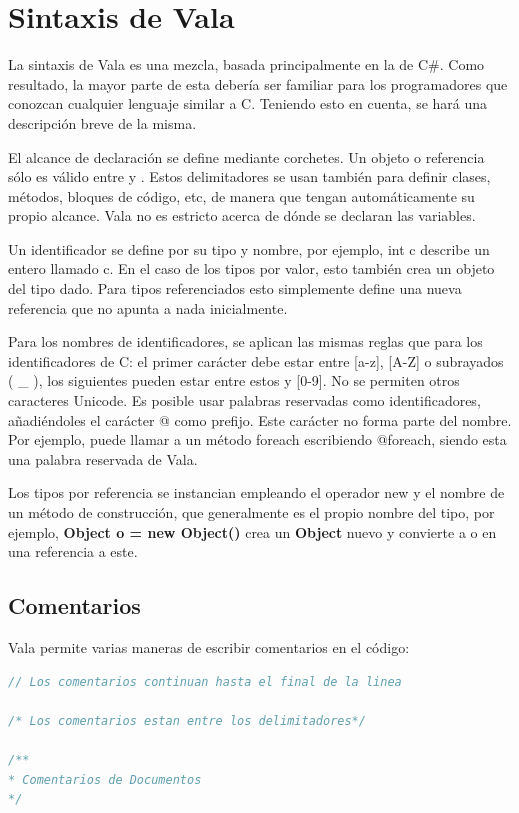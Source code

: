 \documentclass[12pt,twoside]{book}
\begin{document}
\chapter{Sintaxis de Vala}
La sintaxis de Vala es una mezcla, basada principalmente en la de C\#. Como resultado, la mayor parte de esta debería ser familiar para los programadores que conozcan cualquier lenguaje similar a C. Teniendo esto en cuenta, se hará una descripción breve de la misma.

El alcance de declaración se define mediante corchetes. Un objeto o referencia sólo es válido entre { y }. Estos delimitadores se usan también para definir clases, métodos, bloques de código, etc, de manera que tengan automáticamente su propio alcance. Vala no es estricto acerca de dónde se declaran las variables.

Un identificador se define por su tipo y nombre, por ejemplo, int c describe un entero llamado c. En el caso de los tipos por valor, esto también crea un objeto del tipo dado. Para tipos referenciados esto simplemente define una nueva referencia que no apunta a nada inicialmente.

Para los nombres de identificadores, se aplican las mismas reglas que para los identificadores de C: el primer carácter debe estar entre [a-z], [A-Z] o subrayados ( \_ ), los siguientes pueden estar entre estos y [0-9]. No se permiten otros caracteres Unicode. Es posible usar palabras reservadas como identificadores, añadiéndoles el carácter @ como prefijo. Este carácter no forma parte del nombre. Por ejemplo, puede llamar a un método foreach escribiendo @foreach, siendo esta una palabra reservada de Vala.

Los tipos por referencia se instancian empleando el operador new y el nombre de un método de construcción, que generalmente es el propio nombre del tipo, por ejemplo, \textbf{Object o = new Object()} crea un \textbf{Object} nuevo y convierte a o en una referencia a este.

\section{Comentarios}

Vala permite varias maneras de escribir comentarios en el código:
\begin{lstlisting}[language=C++]
// Los comentarios continuan hasta el final de la linea

/* Los comentarios estan entre los delimitadores*/

/**
* Comentarios de Documentos
*/
\end{lstlisting}
\end{document}
